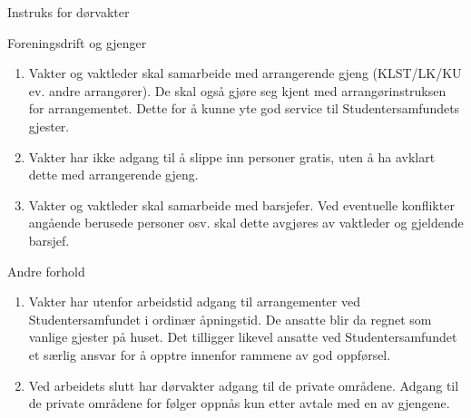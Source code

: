 \begin{instruks*}{Instruks for dørvakter}
    \begin{instruksledd}{Foreningsdrift og gjenger}
        \begin{enumerate}
            \item Vakter og vaktleder skal samarbeide med arrangerende gjeng (KLST/LK/KU ev. andre arrangører). De skal
                også gjøre seg kjent med arrangørinstruksen for arrangementet. Dette for å kunne yte god service til
                Studentersamfundets gjester.
            \item Vakter har ikke adgang til å slippe inn personer gratis, uten å ha avklart dette med arrangerende gjeng.
            \item Vakter og vaktleder skal samarbeide med barsjefer. Ved eventuelle konflikter angående berusede personer
                osv. skal dette avgjøres av vaktleder og gjeldende barsjef.
        \end{enumerate}    
    \end{instruksledd}

    \begin{instruksledd}{Andre forhold}
        \begin{enumerate}
            \item Vakter har utenfor arbeidstid adgang til arrangementer ved Studentersamfundet i ordinær åpningstid. De
                ansatte blir da regnet som vanlige gjester på huset. Det tilligger likevel ansatte ved Studentersamfundet et
                særlig ansvar for å opptre innenfor rammene av god oppførsel.
            \item Ved arbeidets slutt har dørvakter adgang til de private områdene. Adgang til de private områdene for følger
                oppnås kun etter avtale med en av gjengene. 
        \end{enumerate}
    \end{instruksledd}
\end{instruks*}

